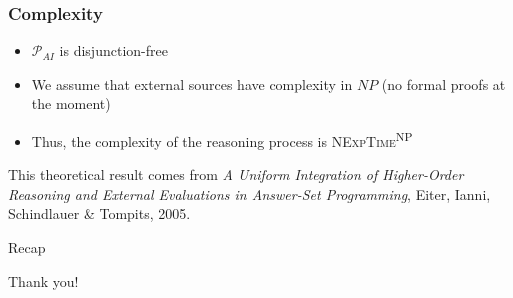 \documentclass[smaller,dvipsnames]{beamer}
\begin{document}
\begin{frame}
	\frametitle{Complexity}
	\begin{itemize}
		\item \(\mathcal{P}_{AI}\) is \alert{disjunction-free}
		\item We assume that \alert{external sources} have complexity in \(NP\) (no formal proofs at the moment)
		\item Thus, the \alert{complexity} of the reasoning process is \textsc{NExpTime}\textsuperscript{\textsc{NP}}
	\end{itemize}
	This theoretical result comes from \emph{A Uniform Integration of Higher-Order Reasoning and External Evaluations
	in Answer-Set Programming}, Eiter, Ianni, Schindlauer \& Tompits, 2005.
\end{frame}

\begin{frame}{Recap}
    \tableofcontents
\end{frame}

\begin{frame}[standout]
    Thank you!
\end{frame}
\end{document}
